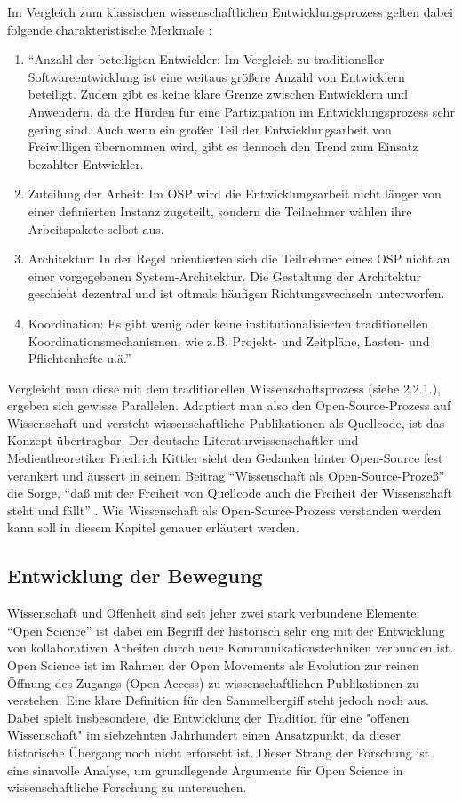 Im Vergleich zum klassischen wissenschaftlichen Entwicklungsprozess gelten dabei folgende charakteristische Merkmale :
\begin{enumerate}
\item “Anzahl der beteiligten Entwickler: Im Vergleich zu traditioneller Softwareentwicklung ist eine weitaus größere Anzahl von Entwicklern beteiligt. Zudem gibt es keine klare Grenze zwischen Entwicklern und Anwendern, da die Hürden für eine Partizipation im Entwicklungsprozess sehr gering sind. Auch wenn ein großer Teil der Entwicklungsarbeit von Freiwilligen übernommen wird, gibt es dennoch den Trend zum Einsatz bezahlter Entwickler.
\item Zuteilung der Arbeit: Im OSP wird die Entwicklungsarbeit nicht länger von einer definierten Instanz zugeteilt, sondern die Teilnehmer wählen ihre Arbeitspakete selbst aus.
\item Architektur: In der Regel orientierten sich die Teilnehmer eines OSP nicht an einer vorgegebenen System-Architektur. Die Gestaltung der Architektur geschieht dezentral und ist oftmals häufigen Richtungswechseln unterworfen.
\item Koordination: Es gibt wenig oder keine institutionalisierten traditionellen Koordinationsmechanismen, wie z.B. Projekt- und Zeitpläne, Lasten- und Pflichtenhefte u.ä.”
\end{enumerate}

Vergleicht man diese mit dem traditionellen Wissenschaftsprozess (siehe 2.2.1.), ergeben sich gewisse Parallelen. Adaptiert man also den Open-Source-Prozess auf Wissenschaft und versteht wissenschaftliche Publikationen als Quellcode, ist das Konzept übertragbar. Der deutsche Literaturwissenschaftler und Medientheoretiker Friedrich Kittler sieht den Gedanken hinter Open-Source fest verankert und äussert in seinem Beitrag “Wissenschaft als Open-Source-Prozeß” die Sorge, “daß mit der Freiheit von Quellcode auch die Freiheit der Wissenschaft steht und fällt” . Wie Wissenschaft als Open-Source-Prozess verstanden werden kann soll in diesem Kapitel genauer erläutert werden. 
\subsection{Entwicklung der Bewegung}
Wissenschaft und Offenheit sind seit jeher zwei stark verbundene Elemente. “Open Science” ist dabei ein Begriff der historisch sehr eng mit der Entwicklung von kollaborativen Arbeiten durch neue Kommunikationstechniken verbunden ist. Open Science ist im Rahmen der Open Movements als Evolution zur reinen Öffnung des Zugangs (Open Access) zu wissenschaftlichen Publikationen zu verstehen. Eine klare Definition für den Sammelbergiff steht jedoch noch aus. Dabei spielt insbesondere, die Entwicklung der Tradition für eine "offenen Wissenschaft" im siebzehnten Jahrhundert einen Ansatzpunkt, da dieser historische Übergang noch nicht erforscht ist.\cite{CREATe_2014} Dieser Strang der Forschung ist eine sinnvolle Analyse, um grundlegende Argumente für Open Science in wissenschaftliche Forschung zu untersuchen. 

